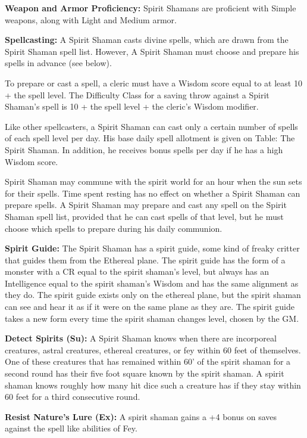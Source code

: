 \classfeatures

\textbf{Weapon and Armor Proficiency:} Spirit Shamans are proficient with Simple weapons, along with Light and Medium armor.

\textbf{Spellcasting:} A Spirit Shaman casts divine spells, which are drawn from the Spirit Shaman spell list. However, A Spirit Shaman must choose and prepare his spells in advance (see below).

To prepare or cast a spell, a cleric must have a Wisdom score equal to at least 10 + the spell level. The Difficulty Class for a saving throw against a Spirit Shaman's spell is 10 + the spell level + the cleric's Wisdom modifier.

Like other spellcasters, a Spirit Shaman can cast only a certain number of spells of each spell level per day. His base daily spell allotment is given on Table: The Spirit Shaman. In addition, he receives bonus spells per day if he has a high Wisdom score.

Spirit Shaman may commune with the spirit world for an hour when the sun sets for their spells. Time spent resting has no effect on whether a Spirit Shaman can prepare spells. A Spirit Shaman may prepare and cast any spell on the Spirit Shaman spell list, provided that he can cast spells of that level, but he must choose which spells to prepare during his daily communion.

\textbf{Spirit Guide:} The Spirit Shaman has a spirit guide, some kind of freaky critter that guides them from the Ethereal plane. The spirit guide has the form of a monster with a CR equal to the spirit shaman's level, but always has an Intelligence equal to the spirit shaman's Wisdom and has the same alignment as they do. The spirit guide exists only on the ethereal plane, but the spirit shaman can see and hear it as if it were on the same plane as they are. The spirit guide takes a new form every time the spirit shaman changes level, chosen by the GM.

\textbf{Detect Spirits (Su):} A Spirit Shaman knows when there are incorporeal creatures, astral creatures, ethereal creatures, or fey within 60 feet of themselves. One of these creatures that has remained within 60' of the spirit shaman for a second round has their five foot square known by the spirit shaman. A spirit shaman knows roughly how many hit dice such a creature has if they stay within 60 feet for a third consecutive round.

\textbf{Resist Nature's Lure (Ex):} A spirit shaman gains a +4 bonus on saves against the spell like abilities of Fey.

